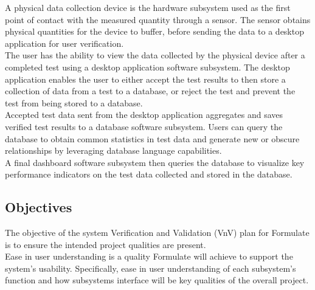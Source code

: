 \documentclass[12pt, titlepage]{article}
\begin{document}
  A physical data collection device is the hardware subsystem used as the first point of contact with the measured quantity through a sensor. The sensor obtains physical quantities for the device to buffer, before sending the data to a desktop application for user verification.\\

  The user has the ability to view the data collected by the physical device after a completed test using a desktop application software subsystem. The desktop application enables the user to either accept the test results to then store a collection of data from a test to a database, or reject the test and prevent the test from being stored to a database.\\

  Accepted test data sent from the desktop application aggregates and saves verified test results to a database software subsystem. Users can query the database to obtain common statistics in test data and generate new or obscure relationships by leveraging database language capabilities.\\

  A final dashboard software subsystem then queries the database to visualize key performance indicators on the test data collected and stored in the database.\newpage





\subsection{Objectives}


  The objective of the system Verification and Validation (VnV) plan for Formulate is to ensure the intended project qualities are present.\\

  Ease in user understanding is a quality Formulate will achieve to support the system's usability.  Specifically, ease in user understanding of each subsystem's function and how subsystems interface will be key qualities of the overall project.\\
\end{document}

